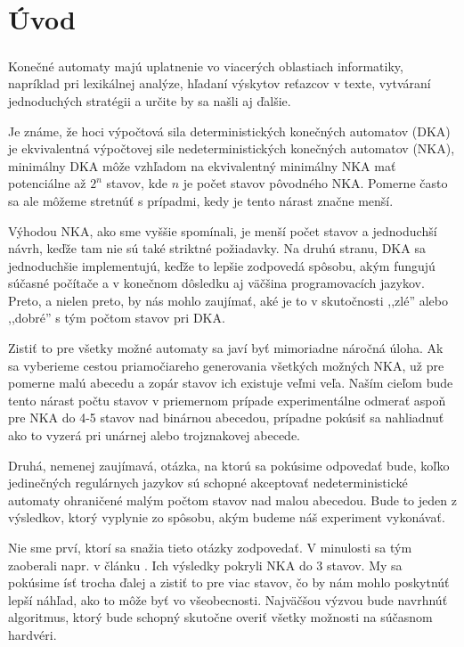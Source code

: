 \chapter*{Úvod}
\paragraph{}
Konečné automaty majú uplatnenie vo viacerých oblastiach informatiky, napríklad pri lexikálnej analýze, hľadaní výskytov reťazcov v texte, vytváraní jednoduchých stratégii a určite by sa našli aj ďalšie.

Je známe, že hoci výpočtová sila deterministických konečných automatov (DKA) je ekvivalentná výpočtovej sile nedeterministických konečných automatov (NKA), minimálny DKA môže vzhľadom na ekvivalentný minimálny NKA mať potenciálne až $2^n$ stavov, kde $n$ je počet stavov pôvodného NKA. Pomerne často sa ale môžeme stretnúť s prípadmi, kedy je tento nárast značne menší.

Výhodou NKA, ako sme vyššie spomínali, je menší počet stavov a jednoduchší návrh, keďže tam nie sú také striktné požiadavky. Na druhú stranu, DKA sa jednoduchšie implementujú, keďže to lepšie zodpovedá spôsobu, akým fungujú súčasné počítače a v konečnom dôsledku aj väčšina programovacích jazykov. Preto, a nielen preto, by nás mohlo zaujímať, aké je to v skutočnosti ,,zlé'' alebo ,,dobré'' s tým počtom stavov pri DKA. 

Zistiť to pre všetky možné automaty sa javí byť mimoriadne náročná úloha. Ak sa vyberieme cestou priamočiareho generovania všetkých možných NKA, už pre pomerne malú abecedu a zopár stavov ich existuje veľmi veľa. Naším cieľom bude tento nárast počtu stavov v priemernom prípade experimentálne odmerať aspoň pre NKA do 4-5 stavov nad binárnou abecedou, prípadne pokúsiť sa nahliadnuť ako to vyzerá pri unárnej alebo trojznakovej abecede.

Druhá, nemenej zaujímavá, otázka, na ktorú sa pokúsime odpovedať bude, koľko jedinečných regulárnych jazykov sú schopné akceptovať nedeterministické automaty ohraničené malým počtom stavov nad malou abecedou. Bude to jeden z výsledkov, ktorý vyplynie zo spôsobu, akým budeme náš experiment vykonávať.

Nie sme prví, ktorí sa snažia tieto otázky zodpovedať. V minulosti sa tým zaoberali napr. v článku \cite{shallit}. Ich výsledky pokryli NKA do 3 stavov. My sa pokúsime ísť trocha ďalej a zistiť to pre viac stavov, čo by nám mohlo poskytnúť lepší náhľad, ako to môže byť vo všeobecnosti. Najväčšou výzvou bude navrhnúť algoritmus, ktorý bude schopný skutočne overiť všetky možnosti na súčasnom hardvéri.


